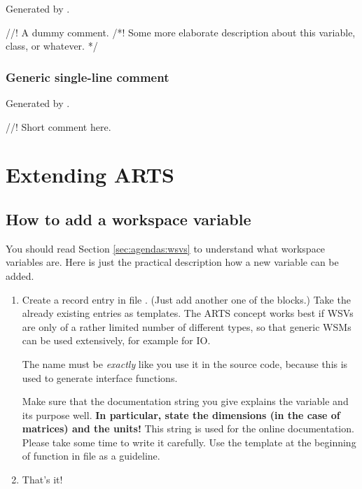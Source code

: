 Generated by .

\begin{code}
  //! A dummy comment.
  /*! 
  Some more elaborate description about this variable, 
  class, or whatever. 
  */
\end{code}

\subsubsection{Generic single-line comment}

Generated by .

\begin{code}
  //! Short comment here.
\end{code}


\section{Extending ARTS}
\label{sec:development:extending}

\subsection{How to add a workspace variable}

You should read Section \ref{sec:agendas:wsvs} to understand what workspace
variables are. Here is just the practical description how a new
variable can be added.

\begin{enumerate}
\item Create a record entry in file . (Just add
  another one of the  blocks.) Take the
  already existing entries as templates. The ARTS concept works best
  if WSVs are only of a rather limited number of different types, so
  that generic WSMs can be used extensively, for example for IO.
  
  The name must be \emph{exactly} like you use it in the source code,
  because this is used to generate interface functions.
  
  Make sure that the documentation string you give explains the
  variable and its purpose well. \textbf{In particular, state the
    dimensions (in the case of matrices) and the units!} This string
  is used for the online documentation. Please take some time to write
  it carefully. Use the template at the beginning of function
   in file  as a
  guideline. 

\item That's it!
\end{enumerate}


